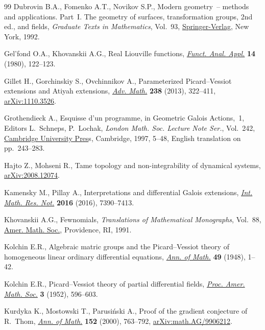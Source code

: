 \documentclass[pdftex]{sigma}%
\numberwithin{equation}{section}
\begin{document}
\begin{thebibliography}{99}
Dubrovin B.A., Fomenko A.T., Novikov S.P., Modern geometry~-- methods and
 applications. {P}art~{I}. The geometry of surfaces, transformation groups, 2nd ed.,
 and fields, \textit{Graduate Texts in Mathematics}, Vol.~93,
 \href{https://doi.org/10.1007/978-1-4612-4398-4}{Springer-Verlag}, New York, 1992.

Gel'fond O.A., Khovanskii A.G., Real {L}iouville functions, \href{https://doi.org/10.1007/BF01086557}{\textit{Funct.
 Anal. Appl.}} \textbf{14} (1980), 122--123.

Gillet H., Gorchinskiy S., Ovchinnikov A., Parameterized {P}icard--{V}essiot
 extensions and {A}tiyah extensions, \href{https://doi.org/10.1016/j.aim.2013.02.006}{\textit{Adv. Math.}} \textbf{238} (2013),
 322--411, \href{https://arxiv.org/abs/1110.3526}{arXiv:1110.3526}.

Grothendieck A., Esquisse d'un programme, in Geometric {G}alois Actions,~1,
 Editors L.~Schneps, P.~Lochak, \textit{London Math. Soc. Lecture Note Ser.},
 Vol.~242, \href{https://doi.org/10.1017/CBO9780511758874.003}{Cambridge University Pres}s, Cambridge, 1997, 5--48, {E}nglish translation on pp.~243--283.

Hajto Z., Mohseni R., Tame topology and non-integrability of dynamical systems,
 \href{https://arxiv.org/abs/2008.12074}{arXiv:2008.12074}.

Kamensky M., Pillay A., Interpretations and differential {G}alois extensions,
 \href{https://doi.org/10.1093/imrn/rnw019}{\textit{Int. Math. Res. Not.}} \textbf{2016} (2016), 7390--7413.

Khovanskii A.G., Fewnomials, \textit{Translations of Mathematical Monographs},
 Vol.~88, \href{https://doi.org/10.1090/mmono/088}{Amer. Math. Soc.}, Providence, RI, 1991.

Kolchin E.R., Algebraic matric groups and the {P}icard--{V}essiot theory of
 homogeneous linear ordinary differential equations, \href{https://doi.org/10.2307/1969111}{\textit{Ann. of Math.}}
 \textbf{49} (1948), 1--42.

Kolchin E.R., Picard--{V}essiot theory of partial differential fields,
 \href{https://doi.org/10.2307/2032594}{\textit{Proc. Amer. Math. Soc.}} \textbf{3} (1952), 596--603.

Kurdyka K., Mostowski T., Parusi\'nski A., Proof of the gradient conjecture of
 {R}.~{T}hom, \href{https://doi.org/10.2307/2661354}{\textit{Ann. of Math.}} \textbf{152} (2000), 763--792,
 \href{https://arxiv.org/abs/math.AG/9906212}{arXiv:math.AG/9906212}.


\end{thebibliography}
\end{document}
